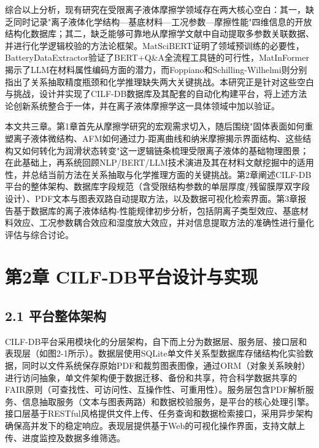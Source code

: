 综合以上分析，现有研究在受限离子液体摩擦学领域存在两大核心空白：其一，缺乏同时记录"离子液体化学结构---基底材料---工况参数---摩擦性能"四维信息的开放结构化数据库；其二，缺乏能够可靠地从摩擦学文献中自动提取多参数关联数据、并进行化学逻辑校验的方法论框架。MatSciBERT\cite{ref1}证明了领域预训练的必要性，BatteryDataExtractor\cite{ref2}验证了BERT+Q\&A全流程工具链的可行性，MatInFormer\cite{ref6}揭示了LLM在材料属性编码方面的潜力，而Foppiano\cite{ref19}和Schilling-Wilhelmi\cite{ref17}则分别指出了关系抽取精度瓶颈和化学推理缺失两大关键挑战。本研究正是针对这些空白与挑战，设计并实现了CILF-DB数据库及其配套的自动化构建平台，将上述方法论创新系统整合于一体，并在离子液体摩擦学这一具体领域中加以验证。

本文共三章。第1章首先从摩擦学研究的宏观需求切入，随后围绕"固体表面如何重塑离子液体微结构、AFM如何通过力-距离曲线和纳米摩擦揭示界面结构、这些结构又如何转化为润滑状态转变"这一逻辑链条梳理受限离子液体的基础物理图景；在此基础上，再系统回顾NLP/BERT/LLM技术演进及其在材料文献挖掘中的适用性，并总结当前方法在关系抽取与化学推理方面的关键挑战。第2章阐述CILF-DB平台的整体架构、数据库字段规范（含受限结构参数的单层厚度/残留膜厚双字段设计）、PDF文本与图表双路自动提取方法，以及数据可视化检索界面。第3章报告基于数据库的离子液体结构-性能规律初步分析，包括阴离子类型效应、基底材料效应、工况参数耦合效应和湿度放大效应，并对信息提取方法的准确性进行量化评估与综合讨论。

\hypertarget{ux7b2c2ux7ae0-cilf-dbux5e73ux53f0ux8bbeux8ba1ux4e0eux5b9eux73b0}{%
\section{第2章 CILF-DB平台设计与实现}\label{ux7b2c2ux7ae0-cilf-dbux5e73ux53f0ux8bbeux8ba1ux4e0eux5b9eux73b0}}

\hypertarget{ux5e73ux53f0ux6574ux4f53ux67b6ux6784}{%
\subsection{2.1 平台整体架构}\label{ux5e73ux53f0ux6574ux4f53ux67b6ux6784}}

CILF-DB平台采用模块化的分层架构，自下而上分为数据层、服务层、接口层和表现层（如图2-1所示）。数据层使用SQLite单文件关系型数据库存储结构化实验数据，同时以文件系统保存原始PDF和裁剪图表图像，通过ORM（对象关系映射）进行访问抽象，单文件架构便于数据迁移、备份和共享，符合科学数据共享的FAIR原则（可查找性、可访问性、互操作性、可重用性）。服务层包含PDF解析服务、信息抽取服务（文本与图表两路）和数据校验服务，是平台的核心处理引擎。接口层基于RESTful风格提供文件上传、任务查询和数据检索接口，采用异步架构确保高并发下的稳定响应。表现层提供基于Web的可视化操作界面，支持文献上传、进度监控及数据多维筛选。

